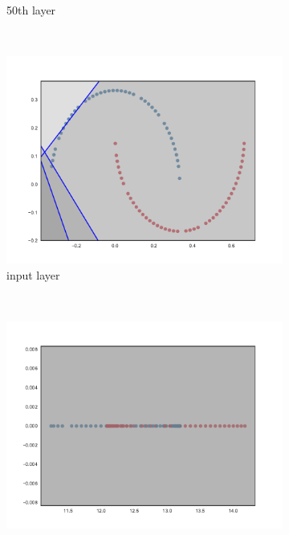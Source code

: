 \begin{figure}
\begin{subfigure}[b]{0.3\textwidth}
        \caption{\ReLUBN 50th layer}
        \label{fig:reluBNInit502}
    \end{subfigure}
    \\
    \begin{subfigure}[b]{0.3\textwidth}
        \includegraphics[width=\textwidth]{img/init/layerwise/conv2d_1-0.pdf}
        \caption{\SepLayer input layer}
        \label{fig:layerwiseInitInput}
    \end{subfigure}
    ~ %
    \begin{subfigure}[b]{0.3\textwidth}
        \includegraphics[width=\textwidth]{img/init/layerwise/conv2d_50-0.pdf}

\end{subfigure}
\end{figure}
